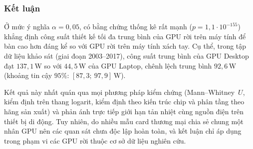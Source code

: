 \begin{table}[H]
  \centering
  \caption{Tổng hợp kết quả kiểm định hai mẫu và các phép kiểm tra độ bền vững giữa Desktop và Laptop.}
  \label{tab:two_sample_tests}
\end{table}

\subsubsection{Kết luận}
Ở mức ý nghĩa $\alpha = 0{,}05$, có bằng chứng thống kê rất mạnh ($p = 1{,}1 \cdot 10^{-155}$) khẳng định công suất thiết kế tối đa trung bình của GPU rời trên máy tính để bàn cao hơn đáng kể so với GPU rời trên máy tính xách tay. Cụ thể, trong tập dữ liệu khảo sát (giai đoạn 2003--2017), công suất trung bình của GPU Desktop đạt $137{,}1$\,W so với $44{,}5$\,W của GPU Laptop, chênh lệch trung bình $92{,}6$\,W (khoảng tin cậy $95\%$: $[87{,}3;\ 97{,}9]$\,W).

Kết quả này nhất quán qua mọi phương pháp kiểm chứng (Mann--Whitney~$U$, kiểm định trên thang logarit, kiểm định theo kiến trúc chip và phân tầng theo hãng sản xuất) và phản ánh trực tiếp giới hạn tản nhiệt cùng nguồn điện trên thiết bị di động. Tuy nhiên, do nhiều mẫu card thương mại chia sẻ chung một nhân GPU nên các quan sát chưa độc lập hoàn toàn, và kết luận chỉ áp dụng trong phạm vi các GPU rời thuộc cơ sở dữ liệu nghiên cứu.
